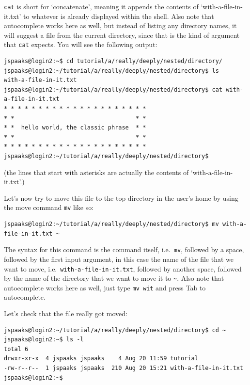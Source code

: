 \lstinline[style=bashinline]{cat} is short for `concatenate', meaning it appends the contents of `with-a-file-in-it.txt' to whatever is already displayed within the shell. Also note that autocomplete works here as well, but instead of listing any directory names, it will suggest a file from the current directory, since that is the kind of argument that \lstinline[style=bashinline]{cat} expects. You will see the following output:
\begin{lstlisting}[style=basic,style=bash]
jspaaks@login2:~$ cd tutorial/a/really/deeply/nested/directory/
jspaaks@login2:~/tutorial/a/really/deeply/nested/directory$ ls
with-a-file-in-it.txt
jspaaks@login2:~/tutorial/a/really/deeply/nested/directory$ cat with-a-file-in-it.txt
* * * * * * * * * * * * * * * * * * * * *
* *                                   * *
* *  hello world, the classic phrase  * *
* *                                   * *
* * * * * * * * * * * * * * * * * * * * *
jspaaks@login2:~/tutorial/a/really/deeply/nested/directory$
\end{lstlisting}
(the lines that start with asterisks are actually the contents of `with-a-file-in-it.txt'.)

Let's now try to move this file to the top directory in the user's home by using the move command \lstinline[style=bashinline]{mv} like so:
\begin{lstlisting}[style=basic,style=bash]
jspaaks@login2:~/tutorial/a/really/deeply/nested/directory$ mv with-a-file-in-it.txt ~
\end{lstlisting}
The syntax for this command is the command itself, i.e.~\lstinline[style=bashinline]{mv}, followed by a space, followed by the first input argument, in this case the name of the file that we want to move, i.e.~\lstinline[style=bashinline]{with-a-file-in-it.txt}, followed by another space, followed by the name of the directory that we want to move it to \lstinline[style=bashinline]{~}. Also note that autocomplete works here as well, just type \lstinline[style=bashinline]{mv wit} and press Tab to autocomplete.

Let's check that the file really got moved:
\begin{lstlisting}[style=basic,style=bash]
jspaaks@login2:~/tutorial/a/really/deeply/nested/directory$ cd ~
jspaaks@login2:~$ ls -l
total 6
drwxr-xr-x  4 jspaaks jspaaks    4 Aug 20 11:59 tutorial
-rw-r--r--  1 jspaaks jspaaks  210 Aug 20 15:21 with-a-file-in-it.txt
jspaaks@login2:~$
\end{lstlisting}

